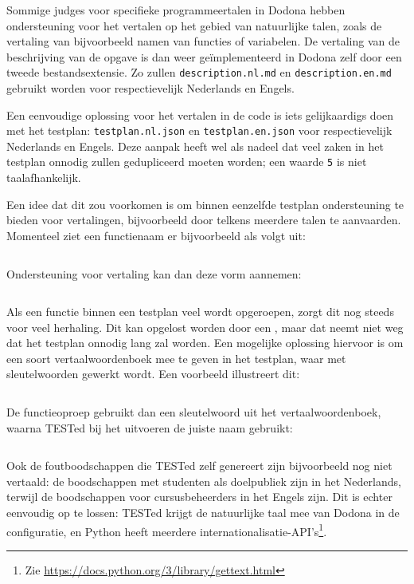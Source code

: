 Sommige judges voor specifieke programmeertalen in Dodona hebben ondersteuning voor het vertalen op het gebied van natuurlijke talen, zoals de vertaling van bijvoorbeeld namen van functies of variabelen.
De vertaling van de beschrijving van de opgave is dan weer geïmplementeerd in Dodona zelf door een tweede bestandsextensie.
Zo zullen \texttt{description.nl.md} en \texttt{description.en.md} gebruikt worden voor respectievelijk Nederlands en Engels.

Een eenvoudige oplossing voor het vertalen in de code is iets gelijkaardigs doen met het testplan: \texttt{testplan.nl.json} en \texttt{testplan.en.json} voor respectievelijk Nederlands en Engels.
Deze aanpak heeft wel als nadeel dat veel zaken in het testplan onnodig zullen gedupliceerd moeten worden;
een waarde \texttt{5} is niet taalafhankelijk.

Een idee dat dit zou voorkomen is om binnen eenzelfde testplan ondersteuning te bieden voor vertalingen, bijvoorbeeld door telkens meerdere talen te aanvaarden.
Momenteel ziet een functienaam er bijvoorbeeld als volgt uit:

\inputminted{json}{code/example-name.json}

Ondersteuning voor vertaling kan dan deze vorm aannemen:

\inputminted{json}{code/example-name-trans.json}

Als een functie binnen een testplan veel wordt opgeroepen, zorgt dit nog steeds voor veel herhaling.
Dit kan opgelost worden door een , maar dat neemt niet weg dat het testplan onnodig lang zal worden.
Een mogelijke oplossing hiervoor is om een soort vertaalwoordenboek mee te geven in het testplan, waar met sleutelwoorden gewerkt wordt.
Een voorbeeld illustreert dit:

\inputminted{json}{code/example-name-dict.json}

De functieoproep gebruikt dan een sleutelwoord uit het vertaalwoordenboek, waarna TESTed bij het uitvoeren de juiste naam gebruikt:

\inputminted{json}{code/example-name-key.json}

Ook de foutboodschappen die TESTed zelf genereert zijn bijvoorbeeld nog niet vertaald: de boodschappen met studenten als doelpubliek zijn in het Nederlands, terwijl de boodschappen voor cursusbeheerders in het Engels zijn.
Dit is echter eenvoudig op te lossen: TESTed krijgt de natuurlijke taal mee van Dodona in de configuratie, en Python heeft meerdere internationalisatie-API's\footnote{Zie \url{https://docs.python.org/3/library/gettext.html}}.


